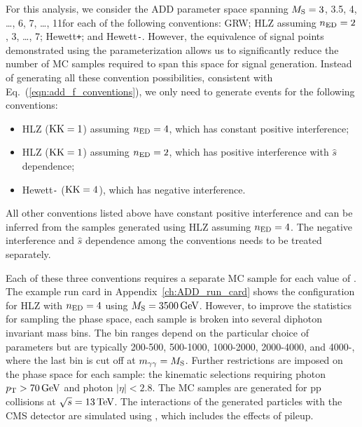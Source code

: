 For this analysis, we consider the ADD parameter space spanning $M_{\rm S} = 3$, 3.5, 4, \dots, 6, 7, \dots, 11\TeV for each of the following conventions: GRW; HLZ assuming $n_{\rm ED}=2$, 3, \dots, 7; Hewett\texttt{+}; and Hewett\texttt{-}. However, the equivalence of signal points demonstrated using the \etaG parameterization allows us to significantly reduce the number of MC samples required to span this space for signal generation. Instead of generating all these convention possibilities, consistent with Eq.~(\ref{eqn:add_f_conventions}), we only need to generate events for the following conventions:
\begin{itemize}
	\item HLZ ($\mathrm{KK}=1$) assuming $n_{\rm ED} = 4$, which has constant positive interference; 
	\item HLZ ($\mathrm{KK}=1$) assuming $n_{\rm ED} = 2$, which has positive interference with $\hat{s}$ dependence;
	\item Hewett\texttt{-} ($\mathrm{KK}=4$), which has negative interference. 
\end{itemize}
All other conventions listed above have constant positive interference and can be inferred from the samples generated using HLZ assuming $n_{\rm ED} = 4$. The negative interference and $\hat{s}$ dependence among the conventions needs to be treated separately.

Each of these three conventions requires a separate MC sample for each value of \Ms. The example \SHERPA run card in Appendix~\ref{ch:ADD_run_card} shows the configuration for HLZ with $n_{\rm ED}=4$ using $M_{\rm S}=3500\,\text{Ge\hspace{-.08em}V}$. However, to improve the statistics for sampling the phase space, each sample is broken into several diphoton invariant mass \Mgg bins. The bin ranges depend on the particular choice of parameters but are typically 200-500, 500-1000, 1000-2000, 2000-4000, and 4000-\Ms\GeVns, where the last bin is cut off at $m_{\gamma\gamma}=M_{\rm S}$. Further restrictions are imposed on the phase space for each sample: the kinematic selections requiring photon $p_{\mathrm{T}} > 70\,\text{Ge\hspace{-.08em}V}$ and photon $|\eta| < 2.8$. The MC samples are generated for pp collisions at $\sqrt{s}=13\,\text{Te\hspace{-.08em}V}$. The interactions of the generated particles with the CMS detector are simulated using \GEANTfour, which includes the effects of pileup.

